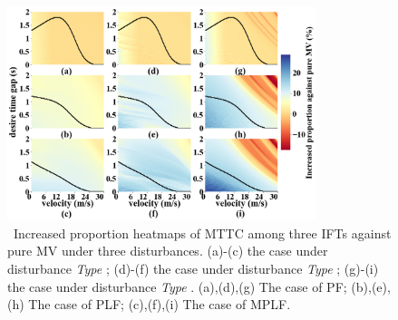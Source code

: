 \documentclass[journal]{IEEEtran}
\begin{document}

\begin{figure}
\includegraphics[width=9cm]{fig5.3_1.png}
\caption{~Increased proportion heatmaps of MTTC among three IFTs against pure MV under three disturbances. (a)-(c) the case under disturbance \textit{Type \uppercase\expandafter{}}; (d)-(f) the case under disturbance \textit{Type \uppercase\expandafter{}}; (g)-(i) the case under disturbance \textit{Type \uppercase\expandafter{}}. (a),(d),(g) The case of PF; (b),(e),(h) The case of PLF; (c),(f),(i) The case of MPLF.} 
\label{Figure3_1}
\end{figure}
\end{document}
